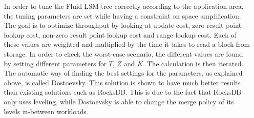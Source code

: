 \noindent
In order to tune the Fluid LSM-tree correctly according to the application area, the tuning parameters are set while having a constraint on space amplification. The goal is to optimize throughput by looking at update cost, zero-result point lookup cost, non-zero result point lookup cost and range lookup cost. Each of these values are weighted and multiplied by the time it takes to read a block from storage. In order to check the worst-case scenario, the different values are found by setting different parameters for $T$, $Z$ and $K$. The calculation is then iterated. The automatic way of finding the best settings for the parameters, as explained above, is called Dostoevsky. This solution is shown to have much better results than existing solutions such as RocksDB\cite{Dostoevsky}. This is due to the fact that RocksDB only uses leveling, while Dostoevsky is able to change the merge policy of its levels in-between workloads.